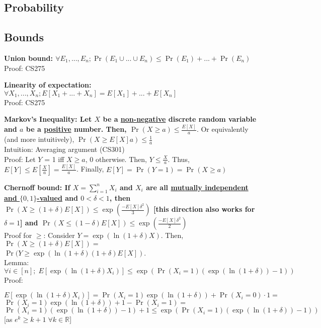 \documentclass[20pt,a4paper,landscape]{extarticle}
\begin{document}
\begin{flushleft}
\section{Probability}
\subsection{Bounds}
\item \textbf{Union bound: $\forall E_1, ..., E_n; \Pr(E_1 \cup ... \cup E_n) \leq \Pr(E_1) + ... + \Pr(E_n)$}\\
Proof: CS275
\item \textbf{Linearity of expectation: $\forall X_1, ..., X_n; E[X_1 + ... + X_n] = E[X_1] + ... + E[X_n]$}\\
Proof: CS275
\item \textbf{Markov's Inequality: Let $X$ be a \underline{non-negative} discrete random variable and $a$ be a \underline{positive} number. Then, $\Pr(X \geq a) \leq \frac{E[X]}{a}$}. Or equivalently (and more intuitively), $\Pr(X \geq E[X]a) \leq \frac{1}{a}$\\
Intuition: Averaging argument (CS301)\\
Proof: Let $Y$ = 1 iff $X \geq a$, 0 otherwise. Then, $Y \leq \frac{X}{a}$. Thus, $E[Y] \leq E[\frac{X}{a}] = \frac{E[X]}{a}$. Finally, $E[Y] = \Pr(Y = 1) = \Pr(X \geq a)$
\clearpage
\item \textbf{Chernoff bound: If $X = \sum_{i=1}^n X_i$ and $X_i$ are all \underline{mutually independent} \underline{and $\{0, 1\}$-valued} and $0 < \delta < 1$, then $\Pr(X \geq (1 + \delta)E[X]) \leq \exp(\frac{-E[X]\delta^2}{3})$ [this direction also works for $\delta = 1$] and $\Pr(X \leq (1 - \delta)E[X]) \leq \exp(\frac{-E[X]\delta^2}{2})$}\\
Proof for $\geq$: Consider $Y=\exp(\ln(1+\delta)X)$. Then, $\Pr(X \geq (1+\delta)E[X]) =$\\
$\Pr(Y \geq \exp(\ln(1+\delta)(1+\delta)E[X])$.\\
Lemma: $\forall i \in [n];\; E[\exp(\ln(1+\delta)X_i)] \leq \exp(\Pr(X_i=1)(\exp(\ln(1+\delta))-1))$\\
Proof:
\begin{adjustwidth}{1em}{}
$E[\exp(\ln(1+\delta)X_i)] = \Pr(X_i=1)\exp(\ln(1+\delta)) + \Pr(X_i=0) \cdot 1 =$\\
$\Pr(X_i=1)\exp(\ln(1+\delta)) + 1 - \Pr(X_i=1) =$\\
$\Pr(X_i=1)(\exp(\ln(1+\delta)) - 1) + 1 \leq \exp(\Pr(X_i=1)(\exp(\ln(1+\delta))-1))$ [as $e^k \geq k+1\;\forall k \in \mathbb{R}$]

\end{adjustwidth}
\end{flushleft}
\end{document}
